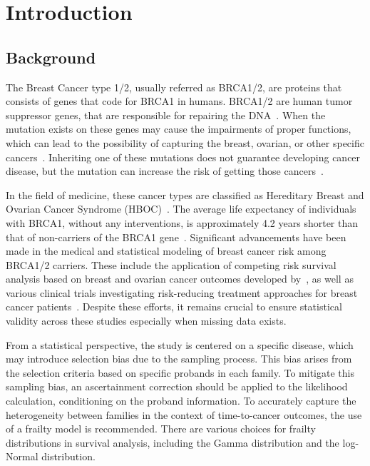 \chapter{Introduction}
\section{Background}
The Breast Cancer type 1/2, usually referred as BRCA1/2, are proteins that consists of genes that code for BRCA1 in humans. BRCA1/2 are human tumor suppressor genes, that are responsible for repairing the DNA~\cite{duncan1998brca1}. 
When the mutation exists on these genes may cause the impairments of proper functions, which can lead to the possibility of capturing the breast, ovarian, or other specific cancers~\cite{greer2006role, haffty2002outcome, huang2018association}. 
Inheriting one of these mutations does not guarantee developing cancer disease, but the mutation can increase the risk of getting those cancers~\cite{friedenson2007brca1}. 

In the field of medicine, these cancer types are classified as Hereditary Breast and Ovarian Cancer Syndrome (HBOC)~\cite{lux2006hereditary}. 
The average life expectancy of individuals with BRCA1, without any interventions, is approximately 4.2 years shorter than that of non-carriers of the BRCA1 gene~\cite{mai2009potential}.
Significant advancements have been made in the medical and statistical modeling of breast cancer risk among BRCA1/2 carriers. These include the application of competing risk survival analysis based on breast and ovarian cancer outcomes developed by~\citet{choi2021competing}, as well as various clinical trials investigating risk-reducing treatment approaches for breast cancer patients~\cite{choi2021association}.
Despite these efforts, it remains crucial to ensure statistical validity across these studies especially when missing data exists.

From a statistical perspective, the study is centered on a specific disease, which may introduce selection bias due to the sampling process. 
This bias arises from the selection criteria based on specific probands in each family. 
To mitigate this sampling bias, an ascertainment correction should be applied to the likelihood calculation, conditioning on the proband information.
To accurately capture the heterogeneity between families in the context of time-to-cancer outcomes, the use of a frailty model is recommended. 
There are various choices for frailty distributions in survival analysis, including the Gamma distribution and the log-Normal distribution.

